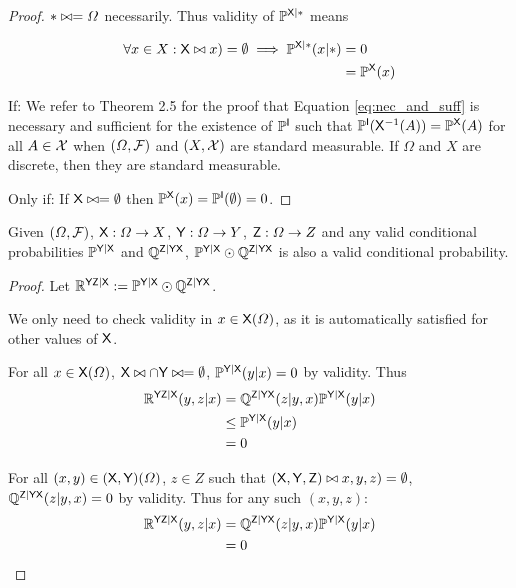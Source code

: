 \begin{proof}
$*\yields *=\Omega$ necessarily. Thus validity of $\prob{P}^{\RV{X}|*}$ means 

\begin{align}
	\forall x\in X: \RV{X}\yields (x)=\emptyset \implies \prob{P}^{\RV{X}|*}(x|*)&=0\\
	&= \prob{P}^{\RV{X}}(x)\label{eq:nec_and_suff}
\end{align}

If: We refer to \citet{ershov_extension_1975} Theorem 2.5 for the proof that Equation \ref{eq:nec_and_suff} is necessary and sufficient for the existence of $\prob{P}^{\RV{I}}$ such that $\prob{P}^{\RV{I}}(\RV{X}^{-1}(A))=\prob{P}^{\RV{X}}(A)$ for all $A\in \sigalg{X}$ when $(\Omega,\sigalg{F})$ and $(X,\sigalg{X})$ are standard measurable. If $\Omega$ and $X$ are discrete, then they are standard measurable.

Only if: If $\RV{X}\yields x=\emptyset$ then $\prob{P}^{\RV{X}}(x)=\prob{P}^{\RV{I}}(\emptyset)=0$.
\end{proof}


\begin{lemma}\label{lem:valid_extendability}
Given $(\Omega,\sigalg{F})$, $\RV{X}:\Omega\to X$, $\RV{Y}:\Omega\to Y$, $\RV{Z}:\Omega\to Z$ and any valid conditional probabilities $\prob{P}^{\RV{Y}|\RV{X}}$ and $\prob{Q}^{\RV{Z}|\RV{Y}\RV{X}}$, $ \prob{P}^{\RV{Y}|\RV{X}}\odot \prob{Q}^{\RV{Z}|\RV{Y}\RV{X}}$ is also a valid conditional probability.
\end{lemma}

\begin{proof}
Let $\prob{R}^{\RV{YZ}|\RV{X}}:=\prob{P}^{\RV{Y}|\RV{X}}\odot \prob{Q}^{\RV{Z}|\RV{Y}\RV{X}}$.

We only need to check validity in $x\in \RV{X}(\Omega)$, as it is automatically satisfied for other values of $\RV{X}$.

For all $x\in \RV{X}(\Omega)$, $\RV{X}\yields x\cap\RV{Y}\yields y=\emptyset$, $\prob{P}^{\RV{Y}|\RV{X}}(y|x)=0$ by validity. Thus
\begin{align}
	\prob{R}^{\RV{YZ}|\RV{X}}(y,z|x) &= \prob{Q}^{\RV{Z}|\RV{YX}}(z|y,x)\prob{P}^{\RV{Y}|\RV{X}}(y|x)\\
								  &\leq \prob{P}^{\RV{Y}|\RV{X}}(y|x)\\
								  &=0
\end{align}

For all $(x,y)\in (\RV{X},\RV{Y})(\Omega)$, $z\in Z$ such that $(\RV{X},\RV{Y},\RV{Z})\yields (x,y,z)=\emptyset$, $\prob{Q}^{\RV{Z}|\RV{YX}}(z|y,x)=0$ by validity. Thus for any such $(x,y,z)$:
\begin{align}
	\prob{R}^{\RV{YZ}|\RV{X}}(y,z|x) &= \prob{Q}^{\RV{Z}|\RV{YX}}(z|y,x)\prob{P}^{\RV{Y}|\RV{X}}(y|x)\\
								  &=0
\end{align}
\end{proof}

